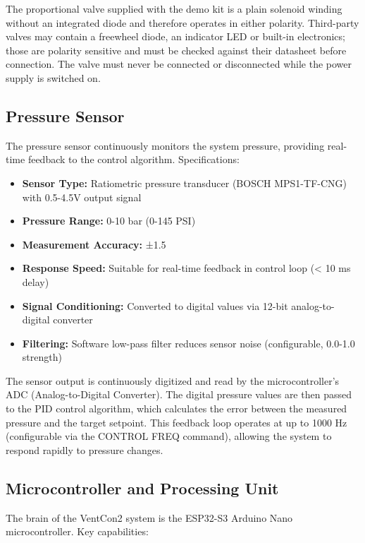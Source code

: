 The proportional valve supplied with the demo kit is a plain solenoid winding without an integrated diode and therefore operates in either polarity. Third-party valves may contain a freewheel diode, an indicator LED or built-in electronics; those are polarity sensitive and must be checked against their datasheet before connection. The valve must never be connected or disconnected while the power supply is switched on.

\subsection{Pressure Sensor}

The pressure sensor continuously monitors the system pressure, providing real-time feedback to the control algorithm. Specifications:

    \begin{itemize}
        \item \textbf{Sensor Type:} Ratiometric pressure transducer (BOSCH MPS1-TF-CNG) with 0.5-4.5V output signal
        \item \textbf{Pressure Range:} 0-10 bar (0-145 PSI)
        \item \textbf{Measurement Accuracy:} ±1.5 %
        \item \textbf{Response Speed:} Suitable for real-time feedback in control loop (< 10 ms delay)
        \item \textbf{Signal Conditioning:} Converted to digital values via 12-bit analog-to-digital converter
        \item \textbf{Filtering:} Software low-pass filter reduces sensor noise (configurable, 0.0-1.0 strength)
    \end{itemize}

The sensor output is continuously digitized and read by the microcontroller's ADC (Analog-to-Digital Converter). The digital pressure values are then passed to the PID control algorithm, which calculates the error between the measured pressure and the target setpoint. This feedback loop operates at up to 1000 Hz (configurable via the CONTROL FREQ command), allowing the system to respond rapidly to pressure changes.

\subsection{Microcontroller and Processing Unit}

The brain of the VentCon2 system is the ESP32-S3 Arduino Nano microcontroller. Key capabilities:

